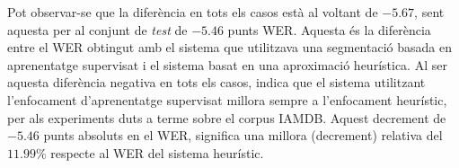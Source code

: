 Pot observar-se que la diferència en tots els casos està al voltant de $-5.67$, sent aquesta per al conjunt de \emph{test} de $-5.46$ punts WER. Aquesta és la diferència entre el WER obtingut amb el sistema que utilitzava una segmentació basada en aprenentatge supervisat i el sistema basat en una aproximació heurística. Al ser aquesta diferència negativa en tots els casos, indica que el sistema utilitzant l'enfocament d'aprenentatge supervisat millora sempre a l'enfocament heurístic, per als experiments duts a terme sobre el corpus IAMDB. Aquest decrement de $-5.46$ punts absoluts en el WER, significa una millora (decrement) relativa del $11.99\%$ respecte al WER del sistema heurístic.